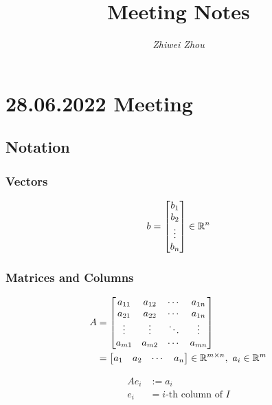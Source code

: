 \documentclass[11pt]{article}
\title{\textbf{Meeting Notes}}
\author{\textit{Zhiwei Zhou}}
\begin{document}
\maketitle

\section{28.06.2022 Meeting}

\subsection{Notation}

\subsubsection*{Vectors}

\begin{align*}
    b = \mqty[
        b_{1} \\
        b_{2} \\
        \vdots \\
        b_{n}
        ]
    \in \mathbb{R}^n
\end{align*}


\subsubsection*{Matrices and Columns}

\begin{align*}
    A &= \mqty[
        a_{11} & a_{12} & \cdots & a_{1n} \\
        a_{21} & a_{22} & \cdots & a_{1n} \\
        \vdots & \vdots & \ddots & \vdots \\
        a_{m1} & a_{m2} & \cdots & a_{mn}
        ]\\
    &= \mqty[
        a_{1} & a_{2} & \cdots & a_{n}
        ]
    \in \mathbb{R}^{m \times n}
    ,\ a_{i} \in \mathbb{R}^{m}
\end{align*}

\begin{align*}
    Ae_{i} &:= a_{i}\\
    e_{i} &= i\text{-th column of }I\\
\end{align*}
\end{document}
